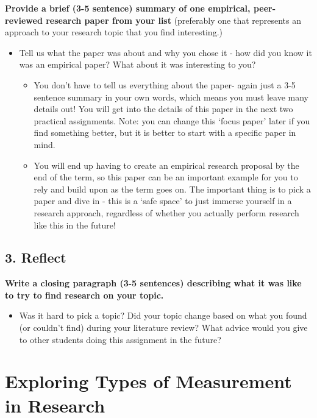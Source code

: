 \documentclass[
]{book}
\providecommand{\tightlist}{%
  \setlength{\itemsep}{0pt}\setlength{\parskip}{0pt}}
\begin{document}
\textbf{Provide a brief (3-5 sentence) summary of one empirical, peer-reviewed research paper from your list} (preferably one that represents an approach to your research topic that you find interesting.)

\begin{itemize}
\tightlist
\item
  Tell us what the paper was about and why you chose it - how did you know it was an empirical paper? What about it was interesting to you?

  \begin{itemize}
  \tightlist
  \item
    You don't have to tell us everything about the paper- again just a 3-5 sentence summary in your own words, which means you must leave many details out! You will get into the details of this paper in the next two practical assignments. Note: you can change this `focus paper' later if you find something better, but it is better to start with a specific paper in mind.
  \item
    You will end up having to create an empirical research proposal by the end of the term, so this paper can be an important example for you to rely and build upon as the term goes on. The important thing is to pick a paper and dive in - this is a `safe space' to just immerse yourself in a research approach, regardless of whether you actually perform research like this in the future!
  \end{itemize}
\end{itemize}

\section*{3. Reflect}\label{reflect}

\textbf{Write a closing paragraph (3-5 sentences) describing what it was like to try to find research on your topic.}

\begin{itemize}
\tightlist
\item
  Was it hard to pick a topic? Did your topic change based on what you found (or couldn't find) during your literature review? What advice would you give to other students doing this assignment in the future?
\end{itemize}

\chapter{Exploring Types of Measurement in Research}\label{exploring-types-of-measurement-in-research}
\end{document}
